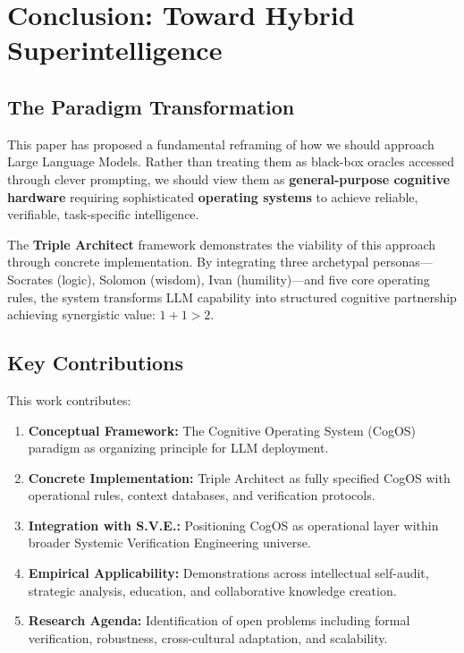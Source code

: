 \documentclass[11pt,a4paper]{article}
\theoremstyle{definition}
\theoremstyle{remark}
\begin{document}
\section{Conclusion: Toward Hybrid Superintelligence}

\subsection{The Paradigm Transformation}

This paper has proposed a fundamental reframing of how we should approach Large Language Models. Rather than treating them as black-box oracles accessed through clever prompting, we should view them as \textbf{general-purpose cognitive hardware} requiring sophisticated \textbf{operating systems} to achieve reliable, verifiable, task-specific intelligence.

The \textbf{Triple Architect} framework demonstrates the viability of this approach through concrete implementation. By integrating three archetypal personas—Socrates (logic), Solomon (wisdom), Ivan (humility)—and five core operating rules, the system transforms LLM capability into structured cognitive partnership achieving synergistic value: $1+1>2$.

\subsection{Key Contributions}

This work contributes:

\begin{enumerate}
    \item \textbf{Conceptual Framework:} The Cognitive Operating System (CogOS) paradigm as organizing principle for LLM deployment.
    
    \item \textbf{Concrete Implementation:} Triple Architect as fully specified CogOS with operational rules, context databases, and verification protocols.
    
    \item \textbf{Integration with S.V.E.:} Positioning CogOS as operational layer within broader Systemic Verification Engineering universe.
    
    \item \textbf{Empirical Applicability:} Demonstrations across intellectual self-audit, strategic analysis, education, and collaborative knowledge creation.
    
    \item \textbf{Research Agenda:} Identification of open problems including formal verification, robustness, cross-cultural adaptation, and scalability.
\end{enumerate}
\end{document}
